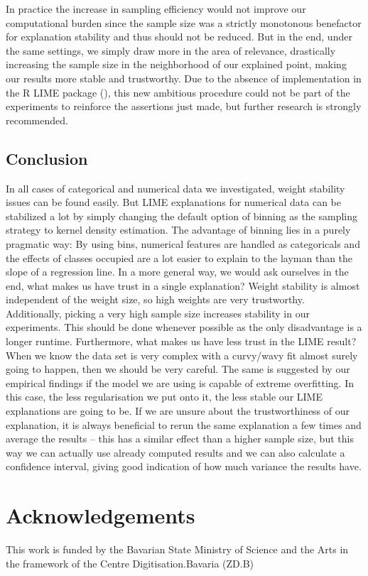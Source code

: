 \documentclass[
]{krantz}
\begin{document}
In practice the increase in sampling efficiency would not improve our computational burden since the sample size was a strictly monotonous benefactor for explanation stability and thus should not be reduced.
But in the end, under the same settings, we simply draw more in the area of relevance, drastically increasing the sample size in the neighborhood of our explained point, making our results more stable and trustworthy.
Due to the absence of implementation in the R LIME package (\citet{thomasp85lime}), this new ambitious procedure could not be part of the experiments to reinforce the assertions just made, but further research is strongly recommended.

\hypertarget{conclusion-2}{%
\section{Conclusion}\label{conclusion-2}}

In all cases of categorical and numerical data we investigated, weight stability issues can be found easily.
But LIME explanations for numerical data can be stabilized a lot by simply changing the default option of binning as the sampling strategy to kernel density estimation.
The advantage of binning lies in a purely pragmatic way:
By using bins, numerical features are handled as categoricals and the effects of classes occupied are a lot easier to explain to the layman than the slope of a regression line.
In a more general way, we would ask ourselves in the end, what makes us have trust in a single explanation?
Weight stability is almost independent of the weight size, so high weights are very trustworthy.
Additionally, picking a very high sample size increases stability in our experiments.
This should be done whenever possible as the only disadvantage is a longer runtime.
Furthermore, what makes us have less trust in the LIME result?
When we know the data set is very complex with a curvy/wavy fit almost surely going to happen, then we should be very careful.
The same is suggested by our empirical findings if the model we are using is capable of extreme overfitting.
In this case, the less regularisation we put onto it, the less stable our LIME explanations are going to be.
If we are unsure about the trustworthiness of our explanation, it is always beneficial to rerun the same explanation a few times and average the results -- this has a similar effect than a higher sample size, but this way we can actually use already computed results and we can also calculate a confidence interval, giving good indication of how much variance the results have.

\hypertarget{acknowledgements}{%
\chapter{Acknowledgements}\label{acknowledgements}}

This work is funded by
the Bavarian State Ministry of Science and the Arts in the framework of the Centre
Digitisation.Bavaria (ZD.B)

  

\backmatter
\printindex
\end{document}
